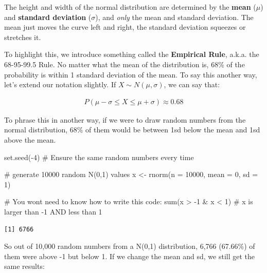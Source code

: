 \documentclass[
  letterpaper,
  DIV=11,
  numbers=noendperiod]{scrreprt}
\newenvironment{Shaded}{\begin{snugshade}}{\end{snugshade}}
\newcommand{\AttributeTok}[1]{\textcolor[rgb]{0.40,0.45,0.13}{#1}}
\newcommand{\CommentTok}[1]{\textcolor[rgb]{0.37,0.37,0.37}{#1}}
\newcommand{\DecValTok}[1]{\textcolor[rgb]{0.68,0.00,0.00}{#1}}
\newcommand{\FunctionTok}[1]{\textcolor[rgb]{0.28,0.35,0.67}{#1}}
\newcommand{\NormalTok}[1]{\textcolor[rgb]{0.00,0.23,0.31}{#1}}
\newcommand{\OtherTok}[1]{\textcolor[rgb]{0.00,0.23,0.31}{#1}}
\newcommand{\SpecialCharTok}[1]{\textcolor[rgb]{0.37,0.37,0.37}{#1}}
\begin{document}
The height and width of the normal distribution are determined by the
\textbf{mean} (\(\mu\)) and \textbf{standard deviation} (\(\sigma\)),
and \emph{only} the mean and standard deviation. The mean just moves the
curve left and right, the standard deviation squeezes or stretches it.

To highlight this, we introduce something called the \textbf{Empirical
Rule}, a.k.a. the 68-95-99.5 Rule. No matter what the mean of the
distribution is, 68\% of the probability is within 1 standard deviation
of the mean. To say this another way, let's extend our notation
slightly. If \(X\sim N(\mu,\sigma)\), we can say that:

\begin{align*}
P(\mu - \sigma \le X \le \mu + \sigma) \approx 0.68
\end{align*}

To phrase this in another way, if we were to draw random numbers from
the normal distribution, 68\% of them would be between 1sd below the
mean and 1sd above the mean.

\begin{Shaded}
\begin{Highlighting}[]
\FunctionTok{set.seed}\NormalTok{(}\SpecialCharTok{{-}}\DecValTok{4}\NormalTok{) }\CommentTok{\# Ensure the same random numbers every time}

\CommentTok{\# generate 10000 random N(0,1) values}
\NormalTok{x }\OtherTok{\textless{}{-}} \FunctionTok{rnorm}\NormalTok{(}\AttributeTok{n =} \DecValTok{10000}\NormalTok{, }\AttributeTok{mean =} \DecValTok{0}\NormalTok{, }\AttributeTok{sd =} \DecValTok{1}\NormalTok{) }

\CommentTok{\# You won\textquotesingle{}t need to know how to write this code:}
\FunctionTok{sum}\NormalTok{(x }\SpecialCharTok{\textgreater{}} \SpecialCharTok{{-}}\DecValTok{1} \SpecialCharTok{\&}\NormalTok{ x }\SpecialCharTok{\textless{}} \DecValTok{1}\NormalTok{) }\CommentTok{\# x is larger than {-}1 AND less than 1}
\end{Highlighting}
\end{Shaded}

\begin{verbatim}
[1] 6766
\end{verbatim}

So out of 10,000 random numbers from a N(0,1) distribution, 6,766
(67.66\%) of them were above -1 but below 1. If we change the mean and
sd, we still get the same results:
\end{document}
